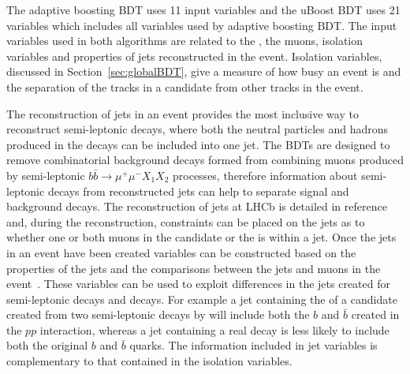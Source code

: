 The adaptive boosting BDT uses 11 input variables and the uBoost BDT uses 21 variables which includes all variables used by adaptive boosting BDT.
The input variables used in both algorithms are related to the \bs, the muons, isolation variables and properties of jets reconstructed in the event. Isolation variables, discussed in Section~\ref{sec:globalBDT}, give a measure of how busy an event is and the separation of the tracks in a \bsmumu candidate from other tracks in the event. 

The reconstruction of jets in an event provides the most inclusive way to reconstruct semi-leptonic decays, where both the neutral particles and hadrons produced in the decays can be included into one jet. 
The BDTs are designed to remove combinatorial background decays formed from combining muons produced by semi-leptonic $b\bar{b} \to \mu^{+} \mu^{-} X_{1} X_{2}$ processes, therefore information about semi-leptonic decays from reconstructed jets can help to separate signal and background decays. 
The reconstruction of jets at LHCb is detailed in reference~\cite{Augusto:1499646, Barter:1970903} and, during the reconstruction, constraints can be placed on the jets as to whether one or both muons in the \bsmumu candidate or the \bs is within a jet. 
Once the jets in an event have been created variables can be constructed based on the properties of the jets and the comparisons between the jets and muons in the event~\cite{CidVidal:2025971}. These variables can be used to exploit differences in the jets created for semi-leptonic decays and \bsmumu decays. For example a jet containing the \bs of a \bsmumu candidate created from two semi-leptonic decays by \bbbarmumux will include both the $b$ and $\bar{b}$ created in the $pp$ interaction, whereas a jet containing a real \bsmumu decay is less likely to include both the original $b$ and $\bar{b}$ quarks. The information included in jet variables is complementary to that contained in the isolation variables.



